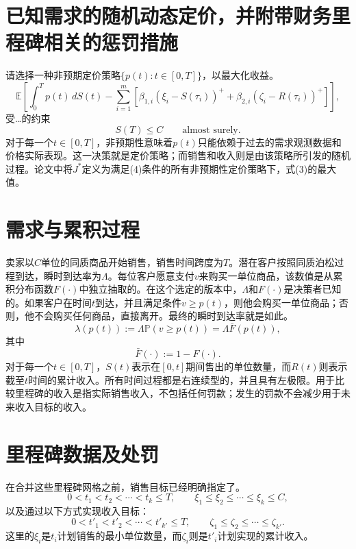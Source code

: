 \documentclass{article}
\begin{document}
\section*{已知需求的随机动态定价，并附带财务里程碑相关的惩罚措施}

请选择一种非预期定价策略$\{p(t):t\in[0,T]\}$，以最大化收益。
\begin{equation}
\mathbb{E}\left[
\int_0^T p(t)\,dS(t)
-\sum_{i=1}^{m}\left[
\beta_{1,i}(\xi_i-S(\tau_i))^{+}
+\beta_{2,i}(\zeta_i-R(\tau_i))^{+}
\right]\right],
\tag{3}
\end{equation}
受…的约束
\begin{equation}
S(T)\le C\qquad\text{almost surely}.
\tag{4}
\end{equation}
对于每一个$t\in[0,T]$，非预期性意味着$p(t)$只能依赖于过去的需求观测数据和价格实际表现。这一决策就是定价策略；而销售和收入则是由该策略所引发的随机过程。论文中将$J^*$定义为满足(4)条件的所有非预期性定价策略下，式(3)的最大值。

\section*{需求与累积过程}

卖家以$C$单位的同质商品开始销售，销售时间跨度为$T$。潜在客户按照同质泊松过程到达，瞬时到达率为$\Lambda$。每位客户愿意支付$v$来购买一单位商品，该数值是从累积分布函数$F(\cdot)$中独立抽取的。在这个选定的版本中，$\Lambda$和$F(\cdot)$是决策者已知的。如果客户在时间$t$到达，并且满足条件$v\ge p(t)$，则他会购买一单位商品；否则，他不会购买任何商品，直接离开。最终的瞬时到达率就是如此。
\begin{equation}
\lambda(p(t)):=\Lambda\mathbb{P}(v\ge p(t))
=\Lambda\bar F(p(t)),
\tag{1}
\end{equation}
其中
\[
\bar F(\cdot):=1-F(\cdot).
\]
对于每一个$t\in[0,T]$，$S(t)$表示在$[0,t]$期间售出的单位数量，而$R(t)$则表示截至$t$时间的累计收入。所有时间过程都是右连续型的，并且具有左极限。用于比较里程碑的收入是指实际销售收入，不包括任何罚款；发生的罚款不会减少用于未来收入目标的收入。

\section*{里程碑数据及处罚}

在合并这些里程碑网格之前，销售目标已经明确指定了。
\[
0<t_1<t_2<\cdots<t_k\le T,
\qquad
\xi_1\le\xi_2\le\cdots\le\xi_k\le C,
\]
以及通过以下方式实现收入目标：
\[
0<t'_1<t'_2<\cdots<t'_{k'}\le T,
\qquad
\zeta_1\le\zeta_2\le\cdots\le\zeta_{k'}.
\]
这里的$\xi_i$是$t_i$计划销售的最小单位数量，而$\zeta_i$则是$t'_i$计划实现的累计收入。
\end{document}
